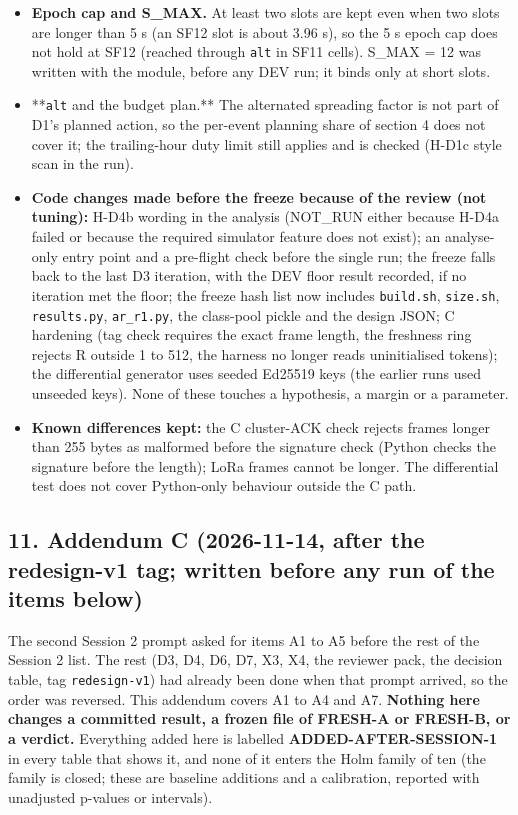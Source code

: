 \begin{itemize}
\item \textbf{Epoch cap and S\_MAX.} At least two slots are kept even when two slots are longer than 5 s (an SF12 slot is about 3.96 s), so the 5 s epoch cap does not hold at SF12 (reached through \texttt{alt} in SF11 cells). S\_MAX = 12 was written with the module, before any DEV run; it binds only at short slots.
\item **\texttt{alt} and the budget plan.** The alternated spreading factor is not part of D1's planned action, so the per-event planning share of section 4 does not cover it; the trailing-hour duty limit still applies and is checked (H-D1c style scan in the run).
\item \textbf{Code changes made before the freeze because of the review (not tuning):} H-D4b wording in the analysis (NOT\_RUN either because H-D4a failed or because the required simulator feature does not exist); an analyse-only entry point and a pre-flight check before the single run; the freeze falls back to the last D3 iteration, with the DEV floor result recorded, if no iteration met the floor; the freeze hash list now includes \texttt{build.sh}, \texttt{size.sh}, \texttt{results.py}, \texttt{ar\_r1.py}, the class-pool pickle and the design JSON; C hardening (tag check requires the exact frame length, the freshness ring rejects R outside 1 to 512, the harness no longer reads uninitialised tokens); the differential generator uses seeded Ed25519 keys (the earlier runs used unseeded keys). None of these touches a hypothesis, a margin or a parameter.
\item \textbf{Known differences kept:} the C cluster-ACK check rejects frames longer than 255 bytes as malformed before the signature check (Python checks the signature before the length); LoRa frames cannot be longer. The differential test does not cover Python-only behaviour outside the C path.
\end{itemize}

\subsection*{11. Addendum C (2026-11-14, after the redesign-v1 tag; written before any run of the items below)}

The second Session 2 prompt asked for items A1 to A5 before the rest of the Session 2 list. The rest (D3, D4, D6, D7, X3, X4, the reviewer pack, the decision table, tag \texttt{redesign-v1}) had already been done when that prompt arrived, so the order was reversed. This addendum covers A1 to A4 and A7. \textbf{Nothing here changes a committed result, a frozen file of FRESH-A or FRESH-B, or a verdict.} Everything added here is labelled \textbf{ADDED-AFTER-SESSION-1} in every table that shows it, and none of it enters the Holm family of ten (the family is closed; these are baseline additions and a calibration, reported with unadjusted p-values or intervals).

